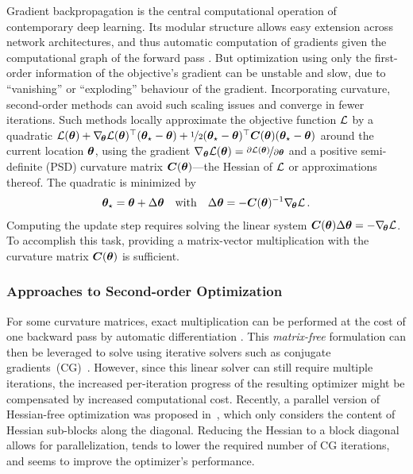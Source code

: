 Gradient backpropagation is the central computational operation of contemporary
deep learning. Its modular structure allows easy extension across network
architectures, and thus automatic computation of gradients given the
computational graph of the forward pass \citep[for a review,
see][]{baydin2018automatic}. But optimization using only the first-order
information of the objective's gradient can be unstable and slow, due to
``vanishing'' or ``exploding'' behaviour of the gradient. Incorporating
curvature, second-order methods can avoid such scaling issues and converge in
fewer iterations. Such methods locally approximate the objective function ${\mathcal{L}}$ by
a quadratic
\begin{math}
  {\mathcal{L}}({\bm{\theta}}) + \nabla_{\!{{\bm{\theta}}}}{\mathcal{L}}({\bm{\theta}})^\top ({\bm{\theta}}_\star - {\bm{\theta}})
  + \nicefrac{1}{2} ({\bm{\theta}}_\star - {\bm{\theta}})^\top {\bm{C}}({\bm{\theta}}) ({\bm{\theta}}_\star - {\bm{\theta}})
\end{math}
around the current location ${\bm{\theta}}$, using the gradient
$\nabla_{{\bm{\theta}}}{\mathcal{L}}({\bm{\theta}}) = \nicefrac{\partial {\mathcal{L}}({\bm{\theta}})}{\partial
  {\bm{\theta}}}$ and a positive semi-definite (PSD) curvature matrix
${\bm{C}}({\bm{\theta}})$---the Hessian of ${\mathcal{L}}$ or approximations thereof. The quadratic
is minimized by
\begin{align}
  \label{hbp::equ:NewtonUpdate}
  {\bm{\theta}}_\star = {\bm{\theta}}
  + \Delta {\bm{\theta}}
  \quad
  \text{with}
  \quad \Delta {\bm{\theta}} = -{\bm{C}}({\bm{\theta}})^{-1} \nabla_{\!{{\bm{\theta}}}}{\mathcal{L}}\,.
\end{align}
Computing the update step requires solving the linear system ${\bm{C}}({\bm{\theta}})
\Delta {\bm{\theta}} = -\nabla_{\!{{\bm{\theta}}}}{\mathcal{L}}$. To accomplish this task, providing a
matrix-vector multiplication with the curvature matrix ${\bm{C}}({\bm{\theta}})$ is
sufficient.

\subsubsection{Approaches to Second-order Optimization}

For some curvature matrices, exact multiplication can be performed at the cost
of one backward pass by automatic differentiation
\citep{pearlmutter1994fast,schraudolph2002fast}. This \emph{matrix-free}
formulation can then be leveraged to solve  using
iterative solvers such as conjugate gradients~(CG)~\citep{martens2010deep}.
However, since this linear solver can still require multiple iterations, the
increased per-iteration progress of the resulting optimizer might be compensated
by increased computational cost. Recently, a parallel version of Hessian-free
optimization was proposed in~\citep{zhang2017blockdiagonal}, which only
considers the content of Hessian sub-blocks along the diagonal. Reducing the
Hessian to a block diagonal allows for parallelization, tends to lower the
required number of CG iterations, and seems to improve the optimizer's
performance.

